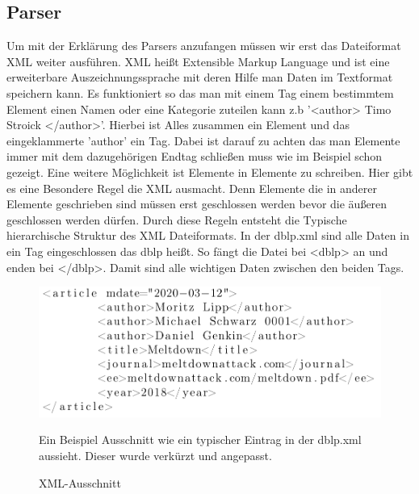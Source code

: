 \subsection{Parser}
Um mit der Erklärung des Parsers anzufangen müssen wir erst das Dateiformat XML weiter ausführen. XML heißt Extensible Markup Language und ist eine erweiterbare Auszeichnungssprache mit deren Hilfe man Daten im Textformat speichern kann. Es funktioniert so das man mit einem Tag einem bestimmtem Element einen Namen oder eine Kategorie zuteilen kann z.b '<author> Timo Stroick </author>'. Hierbei ist Alles zusammen ein Element und das eingeklammerte 'author' ein Tag. Dabei ist darauf zu achten das man Elemente immer mit dem dazugehörigen Endtag schließen muss wie im Beispiel schon gezeigt. Eine weitere Möglichkeit ist Elemente in Elemente zu schreiben. Hier gibt es eine Besondere Regel die XML ausmacht. Denn Elemente die in anderer Elemente geschrieben sind müssen erst geschlossen werden bevor die äußeren geschlossen werden dürfen. Durch diese Regeln entsteht die Typische hierarchische Struktur des XML Dateiformats. In der dblp.xml sind alle Daten in ein Tag eingeschlossen das dblp heißt. So fängt die Datei bei <dblp> an und enden bei </dblp>. Damit sind alle wichtigen Daten zwischen den beiden Tags. 
\newpage
\begin{figure}[!htb]
	\centering
	\includegraphics[width=14cm,keepaspectratio]{bilder/xmlAusschnitt}
	\caption{XML-Ausschnitt}
	Ein Beispiel Ausschnitt wie ein typischer Eintrag in der dblp.xml aussieht. Dieser wurde verkürzt und angepasst.
\end{figure}

